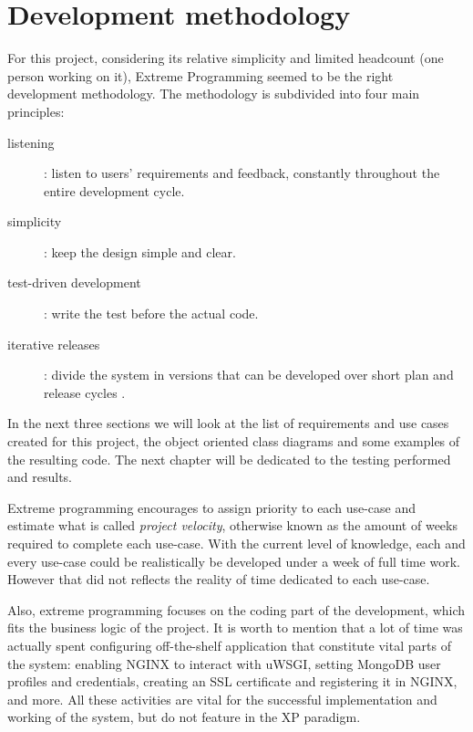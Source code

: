 \section{Development methodology}
For this project, considering its relative simplicity and limited headcount
(one person working on it), Extreme Programming seemed to be the right
development methodology. The methodology is subdivided into four main
principles:
\begin{description}
\item[listening]: listen to users' requirements and feedback, constantly
throughout the entire development cycle.
\item[simplicity]: keep the design simple and clear.
\item[test-driven development]: write the test before the actual code.
\item[iterative releases]: divide the system in versions that can be developed
over short plan and release cycles \cite{RP05}.
\end{description} 
In the next three sections we will look at the list of requirements and use
cases created for this project, the object oriented class diagrams and some
examples of the resulting code. The next chapter will be dedicated to the
testing performed and results.

Extreme programming encourages to assign priority to each use-case
and estimate what is called \emph{project velocity}, otherwise known as the
amount of weeks required to complete each use-case. With the current level of
knowledge, each and every use-case could be realistically be developed under a
week of full time work. However that did not reflects the reality of time
dedicated to each use-case.

Also, extreme programming focuses on the coding part of the development, which
fits the business logic of the project. It is worth to mention that a lot of
time was actually spent configuring off-the-shelf application that constitute
vital parts of the system: enabling NGINX to interact with uWSGI, setting
MongoDB user profiles and credentials, creating an SSL certificate and
registering it in NGINX, and more. All these activities are vital for the
successful implementation and working of the system, but do not feature in the
XP paradigm.

